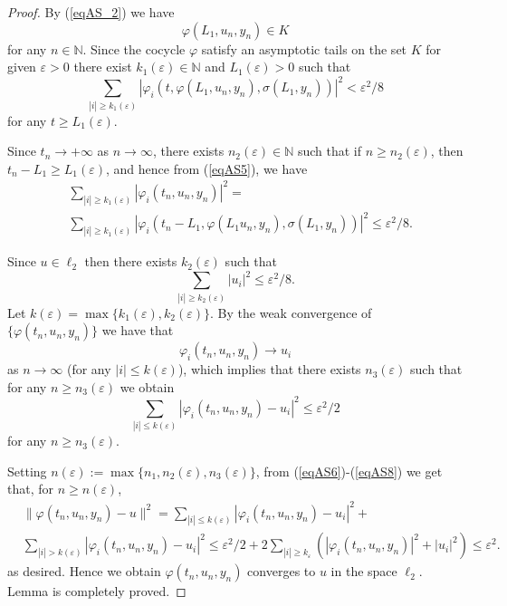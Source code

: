 \documentclass[10pt,a4paper]{amsart}
\begin{document}
\begin{proof}
By (\ref{eqAS_2}) we have
\begin{equation}\label{eqAS4}
\varphi(L_{1},u_n,y_n)\in K
\end{equation}
for any $n\in \mathbb N$. Since the cocycle $\varphi$ satisfy an
asymptotic tails on the set $K$ for given $\varepsilon
>0$ there exist $k_{1}(\varepsilon)\in \mathbb N$ and
$L_{1}(\varepsilon)>0$ such that
\begin{equation}\label{eqAS5}
\sum\limits_{|i|\ge
k_{1}(\varepsilon)}|\varphi_{i}(t,\varphi(L_{1},u_n,y_n),\sigma(L_{1},y_n))|^{2}<\varepsilon^{2}/8
\end{equation}
for any $t\ge L_{1}(\varepsilon)$.

Since $t_n\to +\infty$ as $n\to \infty$, there exists
$n_{2}(\varepsilon)\in \mathbb N$ such  that if $n\ge
n_{2}(\varepsilon)$, then $t_n - L_{1}\ge L_{1}(\varepsilon)$, and
hence from (\ref{eqAS5}), we have
\begin{eqnarray}\label{eqAS6}
& \sum\limits_{|i|\ge
k_{1}(\varepsilon)}|\varphi_{i}(t_n,u_n,y_n)|^{2}=
\\
& \sum\limits_{|i|\ge
k_{1}(\varepsilon)}|\varphi_{i}(t_n-L_{1},\varphi(L_{1}u_n,y_n),\sigma(L_1,y_n))|^{2}\le
\varepsilon^{2}/8.\nonumber
\end{eqnarray}

Since $u\in \ell_{2}$ then there exists $k_{2}(\varepsilon)$ such
that
\begin{equation}\label{eqAS7}
\sum\limits_{|i|\ge k_{2}(\varepsilon)}|u_{i}|^{2}\le
\varepsilon^{2}/8.
\end{equation}
Let $k(\varepsilon)=\max\{k_1(\varepsilon),k_{2}(\varepsilon)\}$.
By the weak convergence of $\{\varphi(t_n,u_n,y_n)\}$ we have that
\begin{equation}\label{eqAS8_1}
\varphi_{i}(t_n,u_n,y_n)\to u_{i}\nonumber
\end{equation}
as $n\to \infty$ (for any $|i|\le k(\varepsilon)$), which implies
that there exists $n_{3}(\varepsilon)$ such that for any $n\ge
n_{3}(\varepsilon)$ we obtain
\begin{equation}\label{eqAS8}
\sum\limits_{|i|\le
k(\varepsilon)}|\varphi_{i}(t_n,u_n,y_n)-u_{i}|^{2}\le
\varepsilon^{2}/2
\end{equation}
for any $n\ge n_{3}(\varepsilon).$

Setting
$n(\varepsilon):=\max\{n_{1},n_{2}(\varepsilon),n_{3}(\varepsilon)\}$,
from (\ref{eqAS6})-(\ref{eqAS8}) we get that, for $n\ge
n(\varepsilon)$,
\begin{eqnarray}\label{eqAS9}
& \|\varphi(t_n,u_n,y_n)-u\|^{2}=\sum\limits_{|i|\le
k(\varepsilon)}|\varphi_{i}(t_n,u_n,y_n)-u_{i}|^{2} +\nonumber\\
& \sum\limits_{|i|>
k(\varepsilon)}|\varphi_{i}(t_n,u_n,y_n)-u_{i}|^{2}\le
\varepsilon^{2}/2+2\sum\limits_{|i|\ge
k_{\varepsilon}}(|\varphi_{i}(t_n,u_n,y_n)|^{2}+|u_{i}|^{2})\le
\varepsilon^{2}.\nonumber
\end{eqnarray}
as desired. Hence we obtain $\varphi(t_n,u_n,y_n)$ converges to $u$
in the space $\ell_{2}$. Lemma is completely proved.
\end{proof}
\end{document}
